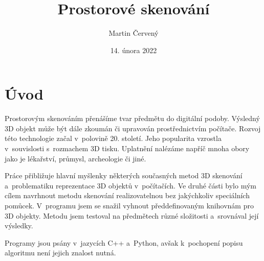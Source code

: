 \documentclass[12pt]{report}			%
\author{Martin Červený}
\title{Prostorové skenování}
\date{14. února 2022}
\begin{document}
	\mytitlepage						%




   {\tableofcontents\newpage}			%

\addtocounter{page}{1}		%
	
	\chapter*{Úvod}
    
        Prostorovým skenováním přenášíme tvar předmětu do digitální podoby. Výsledný 3D objekt může být dále zkoumán či upravován prostřednictvím počítače. Rozvoj této technologie začal v~polovině 20. století. Jeho popularita vzrostla v~souvislosti s~rozmachem 3D tisku. Uplatnění nalézáme napříč mnoha obory jako je lékařství, průmysl, archeologie či jiné.

        Práce  přibližuje hlavní myšlenky některých současných metod 3D skenování a~problematiku reprezentace 3D objektů v~počítačích. Ve druhé části bylo mým cílem navrhnout metodu skenování realizovatelnou bez jakýchkoliv speciálních pomůcek. V~programu jsem se snažil vyhnout předdefinovaným knihovnám pro 3D objekty. Metodu jsem testoval na předmětech různé složitosti a~srovnával její výsledky.

        Programy jsou psány v~jazycích C++ a~Python, avšak k~pochopení popisu algoritmu není jejich znalost nutná.
\end{document}

